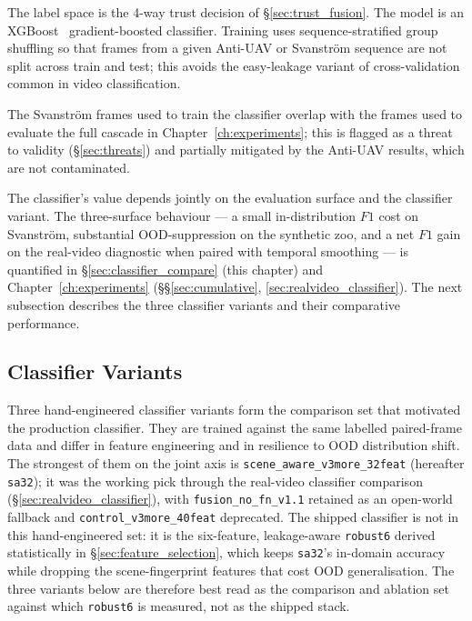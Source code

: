 \documentclass[12pt,a4paper,oneside,openright]{book}
\begin{document}
The label space is the 4-way trust decision of \S\ref{sec:trust_fusion}. The model is an XGBoost~\cite{chen2016xgboost} gradient-boosted classifier. Training uses sequence-stratified group shuffling so that frames from a given Anti-UAV or Svanstr\"om sequence are not split across train and test; this avoids the easy-leakage variant of cross-validation common in video classification.

The Svanstr\"om frames used to train the classifier overlap with the frames used to evaluate the full cascade in Chapter~\ref{ch:experiments}; this is flagged as a threat to validity (\S\ref{sec:threats}) and partially mitigated by the Anti-UAV results, which are not contaminated.

The classifier's value depends jointly on the evaluation surface and the classifier variant. The three-surface behaviour --- a small in-distribution $F1$ cost on Svanstr\"om, substantial OOD-suppression on the synthetic zoo, and a net $F1$ gain on the real-video diagnostic when paired with temporal smoothing --- is quantified in \S\ref{sec:classifier_compare} (this chapter) and Chapter~\ref{ch:experiments} (\S\S\ref{sec:cumulative}, \ref{sec:realvideo_classifier}). The next subsection describes the three classifier variants and their comparative performance.

\subsection{Classifier Variants}
\label{sec:classifier_variants}

Three hand-engineered classifier variants form the comparison set that motivated the production classifier. They are trained against the same labelled paired-frame data and differ in feature engineering and in resilience to OOD distribution shift. The strongest of them on the joint axis is \texttt{scene\_aware\_v3more\_32feat} (hereafter \texttt{sa32}); it was the working pick through the real-video classifier comparison (\S\ref{sec:realvideo_classifier}), with \texttt{fusion\_no\_fn\_v1.1} retained as an open-world fallback and \texttt{control\_v3more\_40feat} deprecated. The shipped classifier is not in this hand-engineered set: it is the six-feature, leakage-aware \texttt{robust6} derived statistically in \S\ref{sec:feature_selection}, which keeps \texttt{sa32}'s in-domain accuracy while dropping the scene-fingerprint features that cost OOD generalisation. The three variants below are therefore best read as the comparison and ablation set against which \texttt{robust6} is measured, not as the shipped stack.
\end{document}
